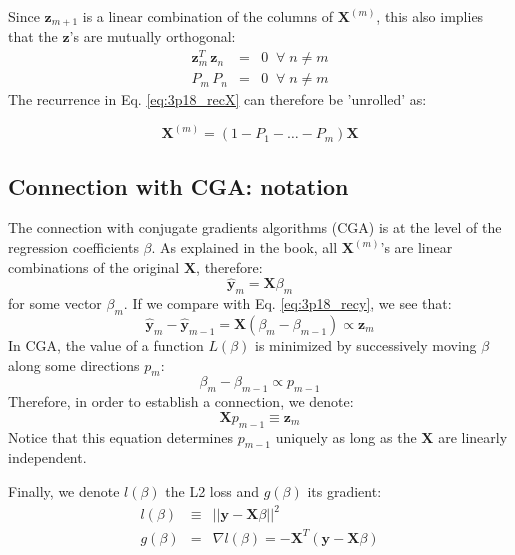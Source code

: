 Since $\mathbf{z}_{m + 1}$ is a linear combination of the columns of
$\mathbf{X}^{(m)}$, this also implies that the $\mathbf{z}$'s are mutually
orthogonal:
\begin{eqnarray*}
    \mathbf{z}_m^T \, \mathbf{z}_n & = & 0 \;\; \forall\; n \neq m\\
    P_m \, P_n & = & 0  \;\; \forall\; n \neq m    
\end{eqnarray*}
The recurrence in Eq. \ref{eq:3p18_recX} can therefore be 'unrolled' as:

\begin{equation}
\mathbf{X}^{(m)} = \left(1 - P_1 - \ldots - P_m\right) \mathbf{X}
\end{equation}

\subsection*{Connection with CGA: notation}
The connection with conjugate gradients algorithms (CGA) is at the level
of the regression coefficients $\beta$. As explained in the book,
all $\mathbf{X}^{(m)}$'s are linear combinations of the original $\mathbf{X}$, therefore:
\begin{equation}
\hat{\mathbf{y}}_m = \mathbf{X}\beta_m
\end{equation}
for some vector $\beta_m$. If we compare with Eq. \ref{eq:3p18_recy},
we see that:
\begin{equation*}
\hat{\mathbf{y}}_m - \hat{\mathbf{y}}_{m - 1} = 
    \mathbf{X} \left(\beta_m - \beta_{m - 1}\right) \propto
    \mathbf{z}_m
\end{equation*}
In CGA, the value of a function $L(\beta)$ is minimized by
successively moving $\beta$ along some directions $p_m$:
\begin{equation*}
\beta_m - \beta_{m - 1} \propto p_{m - 1}
\end{equation*}
Therefore, in order to establish a connection, we denote:
\begin{equation}\label{eq:e3p18_p}
\mathbf{X} p_{m - 1} \equiv \mathbf{z}_m
\end{equation}
Notice that this equation determines $p_{m - 1}$ uniquely
as long as the $\mathbf{X}$ are linearly independent.

Finally, we denote $l(\beta)$ the L2 loss and $g(\beta)$ its gradient:
\begin{eqnarray*}
    l(\beta) & \equiv & ||\mathbf{y} - \mathbf{X} \beta ||^2 \\
    g(\beta) & = & \nabla l(\beta) = - \mathbf{X}^T \left(\mathbf{y}
        - \mathbf{X} \beta \right)
\end{eqnarray*}

